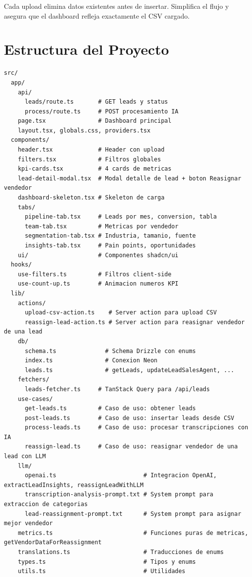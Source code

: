\documentclass[11pt,a4paper]{article}
\begin{document}
Cada upload elimina datos existentes antes de insertar. Simplifica el flujo y asegura que el dashboard refleja exactamente el CSV cargado.

\section{Estructura del Proyecto}

\begin{lstlisting}
src/
  app/
    api/
      leads/route.ts       # GET leads y status
      process/route.ts     # POST procesamiento IA
    page.tsx               # Dashboard principal
    layout.tsx, globals.css, providers.tsx
  components/
    header.tsx             # Header con upload
    filters.tsx            # Filtros globales
    kpi-cards.tsx          # 4 cards de metricas
    lead-detail-modal.tsx  # Modal detalle de lead + boton Reasignar vendedor
    dashboard-skeleton.tsx # Skeleton de carga
    tabs/
      pipeline-tab.tsx     # Leads por mes, conversion, tabla
      team-tab.tsx         # Metricas por vendedor
      segmentation-tab.tsx # Industria, tamanio, fuente
      insights-tab.tsx     # Pain points, oportunidades
    ui/                    # Componentes shadcn/ui
  hooks/
    use-filters.ts         # Filtros client-side
    use-count-up.ts        # Animacion numeros KPI
  lib/
    actions/
      upload-csv-action.ts    # Server action para upload CSV
      reassign-lead-action.ts # Server action para reasignar vendedor de una lead
    db/
      schema.ts              # Schema Drizzle con enums
      index.ts               # Conexion Neon
      leads.ts               # getLeads, updateLeadSalesAgent, ...
    fetchers/
      leads-fetcher.ts     # TanStack Query para /api/leads
    use-cases/
      get-leads.ts         # Caso de uso: obtener leads
      post-leads.ts        # Caso de uso: insertar leads desde CSV
      process-leads.ts     # Caso de uso: procesar transcripciones con IA
      reassign-lead.ts     # Caso de uso: reasignar vendedor de una lead con LLM
    llm/
      openai.ts                         # Integracion OpenAI, extractLeadInsights, reassignLeadWithLLM
      transcription-analysis-prompt.txt # System prompt para extraccion de categorias
      lead-reassignment-prompt.txt      # System prompt para asignar mejor vendedor
    metrics.ts                          # Funciones puras de metricas, getVendorDataForReassignment
    translations.ts                     # Traducciones de enums
    types.ts                            # Tipos y enums
    utils.ts                            # Utilidades
\end{lstlisting}
\end{document}
